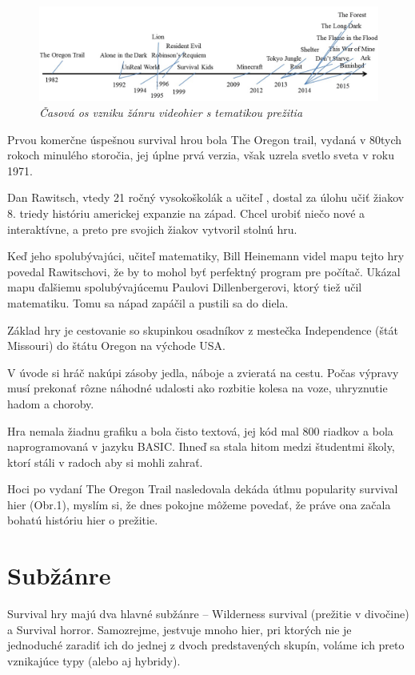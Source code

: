 \documentclass[10pt,twoside,slovak,a4paper]{article}
\begin{document}
\begin{figure}[h]
	\begin{flushleft}
		\includegraphics[width=12.5cm,keepaspectratio]{REID_graf.png}
		\caption{\textit{Časová os vzniku žánru videohier s tematikou prežitia}}
	\end{flushleft}
\end{figure}

Prvou komerčne úspešnou survival hrou bola The Oregon trail, vydaná v 80tych rokoch minulého storočia, jej úplne prvá verzia, však uzrela svetlo sveta v roku 1971. 

Dan Rawitsch, vtedy 21 ročný vysokoškolák a učiteľ , dostal za úlohu učiť žiakov 8. triedy históriu americkej expanzie na západ. Chcel urobiť niečo nové a interaktívne, a preto pre svojich žiakov vytvoril stolnú hru. 

Keď jeho spolubývajúci, učiteľ matematiky,  Bill Heinemann videl mapu tejto hry povedal Rawitschovi, že by to mohol byť perfektný program pre počítač. Ukázal mapu ďalšiemu spolubývajúcemu Paulovi Dillenbergerovi, ktorý tiež učil matematiku. Tomu sa nápad zapáčil a pustili sa do diela. 

Základ hry je cestovanie so skupinkou osadníkov z mestečka Independence (štát Missouri) do štátu Oregon na východe  USA.

V úvode si hráč nakúpi zásoby jedla, náboje a zvieratá na cestu.  Počas výpravy musí prekonať rôzne náhodné udalosti ako rozbitie kolesa na voze, uhryznutie hadom a choroby.

Hra nemala žiadnu grafiku a bola čisto textová, jej kód mal 800 riadkov a bola naprogramovaná v jazyku BASIC. Ihneď sa stala hitom medzi študentmi školy, ktorí stáli v radoch aby si mohli zahrať. 

Hoci po vydaní The Oregon Trail nasledovala dekáda útlmu popularity survival hier (Obr.1), myslím si, že dnes pokojne môžeme povedať, že práve ona začala bohatú históriu hier o prežitie.


\cite{Toppo}

\cite{IGN}

\section{Subžánre} \label{nejaka}
Survival hry majú dva hlavné subžánre – Wilderness survival (prežitie v divočine) a Survival  horror.  Samozrejme, jestvuje mnoho hier, pri ktorých nie je jednoduché zaradiť ich do jednej z dvoch predstavených skupín, voláme ich preto vznikajúce typy (alebo aj hybridy).
\end{document}
